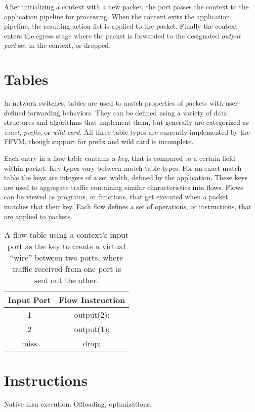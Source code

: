 After initializing a context with a new packet, the port passes the context to
the application pipeline for processing. When the context exits the application
pipeline, the resulting action list is applied to the packet. Finally the
context enters the egress stage where the packet is forwarded to the designated
\emph{output port} set in the context, or dropped.

\section{Tables}
\label{vm:tables}
In network switches, tables are used to match properties of packets
with user-defined forwarding behaviors. They can be defined using a variety of
data structures and algorithms that implement them, but generally are categorized
as \emph{exact}, \emph{prefix}, or \emph{wild card}. All three table types are
currently implemented by the FFVM, though support for prefix and wild card is
incomplete.

Each entry in a flow table contains a \emph{key}, that is compared to a
certain field within packet. Key types vary between match table types. For an
exact match table the keys are integers of a set width, defined by the
application. These keys are used to aggregate traffic containing similar
characteristics into flows. Flows can be viewed as programs, or functions,
that get executed when a packet matches that their key. Each flow defines a
set of operations, or instructions, that are applied to packets.

\begin{table}[h]
  \centering
  \begin{tabular}{||c | c||}
   \hline
   Input Port & Flow Instruction \\ [0.5ex]
   \hline\hline
   1 & output(2); \\
   \hline
   2 & output(1); \\
   \hline
   miss & drop; \\ [1ex]
   \hline
 \end{tabular}
 \caption{A flow table using a context's input port as the key to create a
 virtual ``wire'' between two ports, where traffic received from one port is
 sent out the other.}
 \label{flow_table}
\end{table}

\section{Instructions}
\label{vm:insn}
Native insn execution. Offloading, optimizations.


